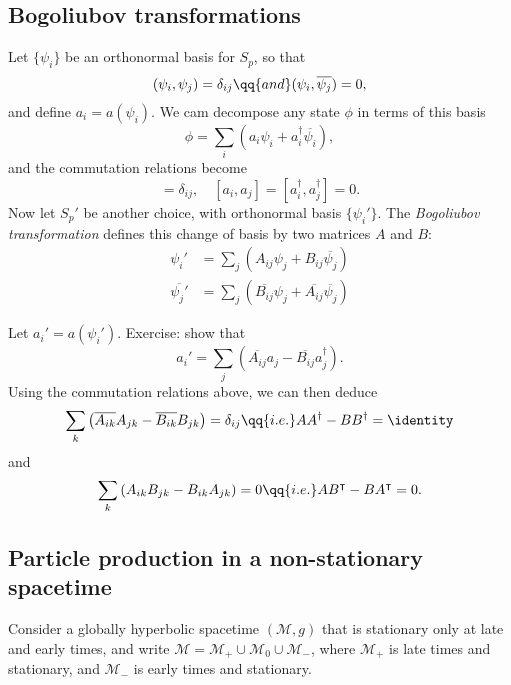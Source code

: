 \documentclass{jknotes}
\begin{document}
\subsection{Bogoliubov transformations}
Let \(\{\psi_i\}\) be an orthonormal basis for \(S_p\), so that
\begin{equation}
    (\psi_i,\psi_j) = \delta_{ij} \qq{and} (\psi_i,\overline{\psi_j})=0,
\end{equation}
and define \(a_i=a(\psi_i)\). We cam decompose any state \(\phi\) in terms of this basis
\begin{equation}
    \phi = \sum_i \left(a_i\psi_i + a_i^\dagger\overline{\psi_i}\right),
\end{equation}
and the commutation relations become
\begin{equation}
    [a_i,a_j]=\delta_{ij},\quad[a_i,a_j]=[a_i^\dagger,a_j^\dagger]=0.
\end{equation}
Now let \(S_p'\) be another choice, with orthonormal basis \(\{\psi_i'\}\). The \emph{Bogoliubov transformation} defines this change of basis by two matrices \(A\) and \(B\):
\begin{align}
    \psi_i' &= \sum_j \left(A_{ij}\psi_j + B_{ij}\overline{\psi_j}\right) \\
    \overline{\psi_j'} &= \sum_j \left(\overline{B_{ij}}\psi_j + \overline{A_{ij}}\overline{\psi_j}\right)
\end{align}

Let \(a_i' = a(\psi_i')\). Exercise: show that 
\begin{equation}
    a_i'=\sum_j\left(\overline{A_{ij}}a_j-\overline{B_{ij}}a_j^\dagger\right).
\end{equation}
Using the commutation relations above, we can then deduce
\begin{equation}
    \sum_k \left(\overline{A_{ik}}A_{jk} - \overline{B_{ik}}B_{jk}\right) = \delta_{ij} \qq{i.e.} AA^\dagger - BB^\dagger = \identity
\end{equation}
and
\begin{equation}
    \sum_k \left(A_{ik}B_{jk} - B_{ik}A_{jk}\right) = 0 \qq{i.e.} AB^\intercal - BA^\intercal = 0.
\end{equation}

\subsection{Particle production in a non-stationary spacetime}
Consider a globally hyperbolic spacetime \((\mathcal{M},g)\) that is stationary only at late and early times, and write \(\mathcal{M}=\mathcal{M}_+\cup\mathcal{M}_0\cup\mathcal{M}_-\), where \(\mathcal{M}_+\) is late times and stationary, and \(\mathcal{M}_-\) is early times and stationary.
\end{document}
